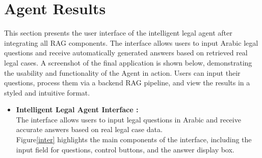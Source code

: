 \section{Agent Results}
This section presents the user interface of the intelligent legal agent after integrating all RAG components. The interface allows users to input Arabic legal questions and receive automatically generated answers based on retrieved real legal cases. A screenshot of the final application is shown below, demonstrating the usability and functionality of the Agent in action. Users can input their questions, process them via a backend RAG pipeline, and view the results in a styled and intuitive format.
\begin{itemize}
	\item \textbf{Intelligent Legal Agent Interface :}\\
   The interface allows users to input legal questions in Arabic and receive accurate answers based on real legal case data.\\
   Figure\ref{inter} highlights the main components of the interface, including the input field for questions, control buttons, and the answer display box.


\end{itemize}
